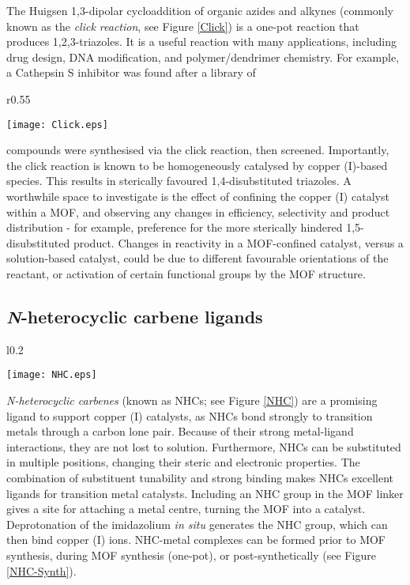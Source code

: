 \documentclass[12pt,a4paper]{article}
\begin{document}
The Huigsen 1,3-dipolar cycloaddition of organic azides and alkynes (commonly known as the \emph{click reaction}, see Figure \ref{Click}) is a one-pot reaction that produces 1,2,3-triazoles\cite{tornoe2002peptidotriazoles}. It is a useful reaction with many applications, including drug design, DNA modification, and polymer/dendrimer chemistry\cite{meldal2008cu}. For example, a Cathepsin S inhibitor was found after a library of \begin{wrapfigure}{r}{0.55\textwidth}
\begin{center}
\texttt{[image: Click.eps]}
\end{center}
\caption{The click reaction is homogeneously catalysed by a Cu(I) species to selectively give 1,4-disubstituted triazoles.}\label{Click}
\end{wrapfigure}compounds were synthesised via the click reaction, then screened\cite{patterson2006identification}. Importantly, the click reaction is known to be homogeneously catalysed by copper (I)-based species\cite{tornoe2002peptidotriazoles,meldal2008cu}. This results in sterically favoured 1,4-disubstituted triazoles\cite{casarrubios2013click}. A worthwhile space to investigate is the effect of confining the copper (I) catalyst within a MOF, and observing any changes in efficiency, selectivity and product distribution - for example, preference for the more sterically hindered 1,5-disubstituted product. Changes in reactivity in a MOF-confined catalyst, versus a solution-based catalyst, could be due to different favourable orientations of the reactant, or activation of certain functional groups by the MOF structure.

\subsection{\emph{N}-heterocyclic carbene ligands}\label{sec:NHC}
\begin{wrapfigure}{l}{0.2\textwidth}
\begin{center}
\texttt{[image: NHC.eps]}
\end{center}
\caption{General form of an imidazolium-derived NHC.}\label{NHC}
\end{wrapfigure}

\emph{\emph{N}-heterocyclic carbenes} (known as NHCs; see Figure \ref{NHC}) are a promising ligand to support copper (I) catalysts, as NHCs bond strongly to transition metals through a carbon lone pair. Because of their strong metal-ligand interactions, they are not lost to solution\cite{ezugwu2015metal}. Furthermore, NHCs can be substituted in multiple positions, changing their steric and electronic properties. The combination of substituent tunability and strong binding makes NHCs excellent ligands for transition metal catalysts. Including an NHC group in the MOF linker gives a site for attaching a metal centre, turning the MOF into a catalyst. Deprotonation of the imidazolium \emph{in situ} generates the NHC group, which can then bind copper (I) ions. NHC-metal complexes can be formed prior to MOF synthesis, during MOF synthesis (one-pot), or post-synthetically\cite{ezugwu2015metal} (see Figure \ref{NHC-Synth}).
\end{document}
